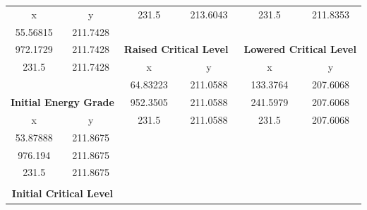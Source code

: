 \begin{center}
\begin{tabular}{|cc|cc|cc|}
            \cline{1-2}
            x        & y                                             & 231.5    & 213.6043                                   & 231.5    & 211.8353                                    \\
            55.56815 & 211.7428                                      &          &                                            &          &                                             \\
            972.1729 & 211.7428                                      & \multicolumn{2}{c|}{\textbf{Raised Critical Level~ }} & \multicolumn{2}{c|}{\textbf{Lowered Critical Level }}  \\ 
            \cline{3-6}
            231.5    & 211.7428                                      & x        & y                                          & x        & y                                           \\
                     &                                               & 64.83223 & 211.0588                                   & 133.3764 & 207.6068                                    \\
            \multicolumn{2}{|c|}{\textbf{Initial Energy Grade }}     & 952.3505 & 211.0588                                   & 241.5979 & 207.6068                                    \\ 
            \cline{1-2}
            x        & y                                             & 231.5    & 211.0588                                   & 231.5    & 207.6068                                    \\
            53.87888 & 211.8675                                      &          &                                            &          &                                             \\
            976.194  & 211.8675                                      &          &                                            &          &                                             \\
            231.5    & 211.8675                                      &          &                                            &          &                                             \\
                     &                                               &          &                                            &          &                                             \\
            \multicolumn{2}{|c|}{\textbf{Initial Critical Level}}    &          &                                            &          &                                             \\ 

\end{tabular}
\end{center}
